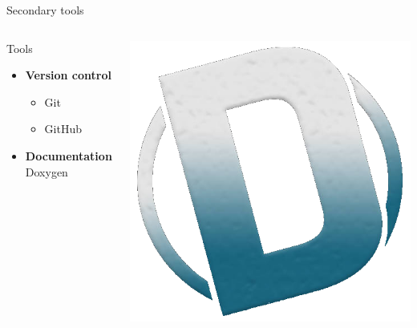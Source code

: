 \begin{frame}{Secondary tools}
    \begin{columns}
        \begin{column}{0.5\textwidth}
            Tools
            \begin{itemize}
                \item \textbf{Version control}
                \begin{itemize}
                    \item Git
                    \item GitHub
                \end{itemize}
                \item \textbf{Documentation} Doxygen
                \end{itemize}
            \end{column}
        \begin{column}{0.5\textwidth}
            \begin{center}
                
                

                \includegraphics[scale=0.1]{./images/doxygen-logo.png}
                \end{center}
        \end{column}
    \end{columns}
\end{frame}
